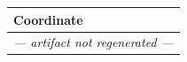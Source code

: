 \begin{tabular}{lrr}
\toprule
Coordinate & \vfive{} & \vsix{} \\
\midrule
\multicolumn{3}{c}{\textit{--- artifact not regenerated ---}} \\
\bottomrule
\end{tabular}
